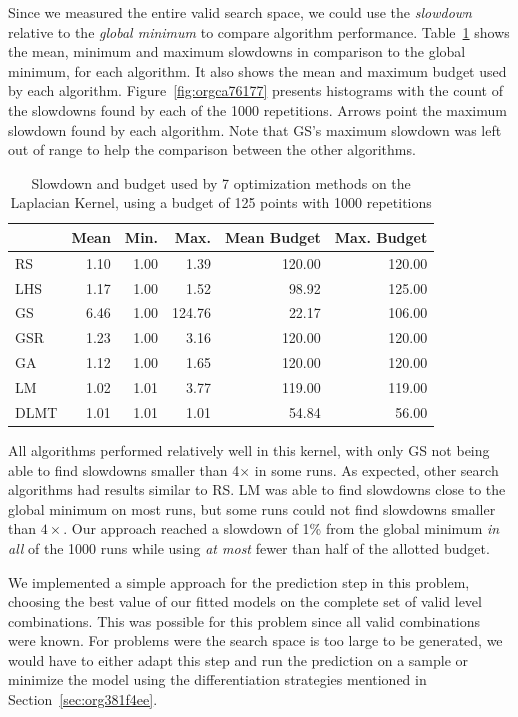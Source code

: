 \documentclass[conference]{IEEEtran}
\begin{document}
Since we measured the entire valid search space, we could use the \emph{slowdown}
relative to the \emph{global minimum} to compare algorithm performance.
Table~\ref{tab:gpu_laplacian_compare_budget} shows the mean, minimum and
maximum slowdowns in comparison to the global minimum, for each algorithm. It
also shows the mean and maximum budget used by each algorithm.
Figure~\ref{fig:orgca76177} presents histograms with the
count of the slowdowns found by each of the 1000 repetitions. Arrows point the
maximum slowdown found by each algorithm. Note that GS's maximum slowdown was
left out of range to help the comparison between the other algorithms.

\begin{table}[b]
\centering
\caption{Slowdown and budget used by 7 optimization methods on the Laplacian Kernel, using a budget of 125 points with 1000 repetitions}
\label{tab:gpu_laplacian_compare_budget}
\begingroup\footnotesize
\begin{tabular}{lrrrrr}
  \toprule
 & Mean & Min. & Max. & Mean Budget & Max. Budget \\
  \midrule
RS & 1.10 & 1.00 & 1.39 & 120.00 & 120.00 \\
  LHS & 1.17 & 1.00 & 1.52 & 98.92 & 125.00 \\
  GS & 6.46 & 1.00 & 124.76 & 22.17 & 106.00 \\
  GSR & 1.23 & 1.00 & 3.16 & 120.00 & 120.00 \\
  GA & 1.12 & 1.00 & 1.65 & 120.00 & 120.00 \\
  LM & 1.02 & 1.01 & 3.77 & 119.00 & 119.00 \\
   \rowcolor{red!25}DLMT & 1.01 & 1.01 & 1.01 & 54.84 & 56.00 \\
   \bottomrule
\end{tabular}
\endgroup
\end{table}

All algorithms performed relatively well in this kernel, with only GS not being
able to find slowdowns smaller than 4\(\times\) in some runs. As expected, other
search algorithms had results similar to RS. LM was able to find slowdowns close
to the global minimum on most runs, but some runs could not find slowdowns
smaller than \(4\times\). Our approach reached a slowdown of 1\% from the global
minimum \emph{in all} of the 1000 runs while using \emph{at most} fewer than half of the
allotted budget.

We implemented a simple approach for the prediction step in this problem,
choosing the best value of our fitted models on the complete set of valid level
combinations. This was possible for this problem since all valid combinations
were known. For problems were the search space is too large to be generated, we
would have to either adapt this step and run the prediction on a sample or
minimize the model using the differentiation strategies mentioned in
Section~\ref{sec:org381f4ee}.
\end{document}
